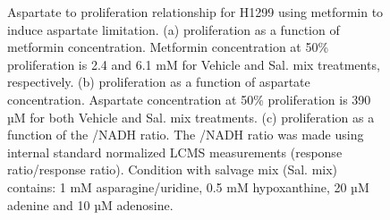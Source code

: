 \begin{figure}[ht]
\begin{subfigure}[b]{0.49\textwidth}
         \caption{}
         \label{fig:app_ch2:H1299_Met_NAD_vs_prlfr}
     \end{subfigure}
        \caption[H1299 metformin titration aspartate to proliferation.]{
        Aspartate to proliferation relationship for H1299 using metformin to induce aspartate limitation.
        (a) proliferation as a function of metformin concentration.
        Metformin concentration at 50\% proliferation is 2.4 and 6.1 mM for Vehicle and Sal. mix treatments, respectively.
        (b) proliferation as a function of aspartate concentration.
        Aspartate concentration at 50\% proliferation is 390 µM for both Vehicle and Sal. mix treatments.
        (c) proliferation as a function of the \NAD{}/NADH ratio.
        The \NAD{}/NADH ratio was made using internal standard normalized LCMS measurements (response ratio/response ratio).
        Condition with salvage mix (Sal. mix) contains: 1 mM asparagine/uridine, 0.5 mM hypoxanthine, 20 µM adenine and 10 µM adenosine.
        }
        \label{fig:app_ch2:H1299_asp_prlfr_met}
\end{figure}

